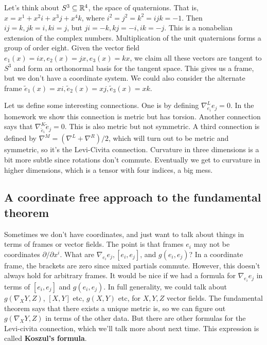     \begin{example}
        Let's think about $S ^3\subseteq \mathbb{R}^4$, the space of quaternions. That is, $x=x^1+x^2i+x^3j+x^4k$, where $i^2=j^2=k^2=ijk=-1$. Then $ij=k, jk=i, ki=j$, but $ji=-k, kj=-i, ik=-j$. This is a nonabelian extension of the complex numbers. Multiplication of the unit quaternions forms a group of order eight. Given the vector field $e_1(x)=ix, e_2(x)=jx, e_3(x)=kx$, we claim all these vectors are tangent to $S^3$ and form an orthonormal basis for the tangent space. This gives us a frame, but we don't have a coordinate system. We could also consider the alternate frame $\widetilde e_1(x)=xi,\widetilde e_2(x)=xj,\widetilde e_3(x)=xk$.

        Let us define some interesting connections. One is by defining $\nabla^L _{e_i }e_j =0$. In the homework we show this connection is metric but has torsion. Another connection says that $\nabla^K _{\widetilde e_i }\widetilde e_j=0 $. This is also metric but not symmetric. A third connection is defined by $\nabla^M=(\nabla^L+\nabla^R)/2$, which will turn out to be metric and symmetric, so it's the Levi-Civita connection.
    Curvature in three dimensions is a bit more subtle since rotations don't commute. Eventually we get to curvature in higher dimensions, which is a tensor with four indices, a big mess.
    \end{example}
    \subsection{A coordinate free approach to the fundamental theorem}
    Sometimes we don't have coordinates, and just want to talk about things in terms of frames or vector fields. The point is that frames $e_i $ may not be coordinates $\partial /\partial x^i $. What are $\nabla _{e_i }e_j, [e_i,e_j ]$, and $g(e_i ,e_j )$? In a coordinate frame, the brackets are zero since mixed partials commute. However, this doesn't always hold for arbitrary frames. It would be nice if we had a formula for $\nabla _{e_i }e_j $ in terms of $[e_i ,e_j ]$ and $g(e_i ,e_j )$. In full generality, we could talk about $g(\nabla_XY,Z)$, $[X,Y]$ etc, $g(X,Y)$ etc, for $X,Y,Z$ vector fields. The fundamental theorem says that there exists a unique metric is, so we can figure out $g(\nabla_XY,Z)$ in terms of the other data. But there are other formulas for the Levi-civita connection, which we'll talk more about next time. This expression is called \textbf{Koszul's formula}.


